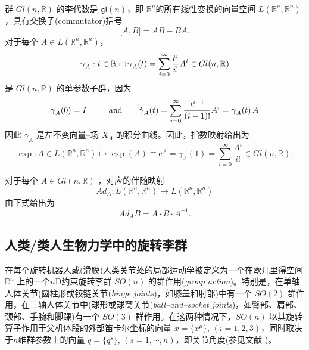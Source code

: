 \documentclass[11pt,fontset=founder]{ctexart}
\begin{document}
群 $Gl(n,\mathbb{R})$ 的李代数是 $\mathfrak{gl}(n)$，即 $\mathbb{R}^{n}$的所有线性变换的向量空间 $L(\mathbb{R}^{n},\mathbb{R}^{n})$，具有交换子(commutator)括号
\begin{equation*}
\lbrack A,B]=AB-BA.
\end{equation*}%
对于每个 $A\in L(\mathbb{R}^{n},\mathbb{R}^{n})$，
\begin{equation*}
\gamma _{A}:t\in \mathbb{R\mapsto }\gamma _{A}(t)=\sum_{i=0}^{\infty }\frac{%
t^{i}}{i!}A^{i}\in Gl(n,\mathbb{R})
\end{equation*}%
是 $Gl(n,\mathbb{R})$ 的单参数子群，因为
\begin{equation*}
\gamma _{A}(0)=I\qquad \text{and\qquad }\dot{\gamma}_{A}(t)=\sum_{i=0}^{%
\infty }\frac{t^{i-1}}{(i-1)!}A^{i}=\gamma _{A}(t)\,A
\end{equation*}
因此 $\gamma _{A}$ 是左不变向量–场 $X_{A}$ 的积分曲线。因此，指数映射给出为
\begin{equation*}
\exp :A\in L(\mathbb{R}^{n},\mathbb{R}^{n})\mapsto \exp (A)\equiv \mathrm{e}%
^{A}=\gamma _{A}(1)=\sum_{i=0}^{\infty }\frac{A^{i}}{i!}\in Gl(n,\mathbb{R}).
\end{equation*}

对于每个 $A\in Gl(n,\mathbb{R})$ ，对应的伴随映射
\begin{equation*}
Ad_{A}:L(\mathbb{R}^{n},\mathbb{R}^{n})\rightarrow L(\mathbb{R}^{n},\mathbb{R%
}^{n})
\end{equation*}%
由下式给出为
\begin{equation*}
Ad_{A}B=A\cdot B\cdot A^{-1}.
\end{equation*}

\subsection{人类/类人生物力学中的旋转李群}

在每个旋转机器人或(滑膜)人类关节处的局部运动学被定义为一个在欧几里得空间 $\mathbb{R}^{n}$ 上的一个$n$D约束旋转李群 $SO(n)$ 的群作用(\emph{group action})。特别是，在单轴人体关节(圆柱形或铰链关节(\emph{hinge joints})，如膝盖和肘部)中有一个 $SO(2)$ 群作用，在三轴人体关节中(球形或球窝关节(\emph{ball--and--socket joints})，如臀部、肩部、颈部、手腕和脚踝)有一个 $SO(3)$ 群作用。在这两种情况下，$SO(n)$ 以其旋转算子作用于父机体段的外部笛卡尔坐标的向量 $x=\{x^{\mu }\},\,(i=1,2,3)$，同时取决于$n$维群参数上的向量 $q=\{q^{s}\},\,(s=1,\cdots ,n)$，即关节角度(参见文献 \cite{SIAM,GaneshSprSml,GaneshSprBig,GaneshADG})。
\end{document}
